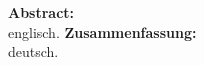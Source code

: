     {\small
        \textbf{Abstract:}\\
        englisch.
        \lipsum[1] 
    }
    \vspace{2cm}
    {\small
        \textbf{Zusammenfassung:}\\
        deutsch.
        \lipsum[1] 
    }
